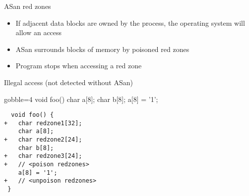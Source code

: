 \begin{frame}[fragile]
  \begin{block}{ASan red zones}
    \begin{itemize}
      \item If adjacent data blocks are owned by the process, the operating system will allow an access
      \item<2> ASan surrounds blocks of memory by poisoned red zones
      \item<2> Program stops when accessing a red zone
    \end{itemize}
  \end{block}
  \begin{exampleblock}{Illegal access (not detected without ASan)}
    \begin{multicols}{2}
      \begin{overprint}
        \begin{cppcode*}{gobble=4}
          void foo() {
            char a[8];
            char b[8];
            a[8] = '1';
          }
        \end{cppcode*}
        \begin{verbatim}
  void foo() {
+   char redzone1[32];
    char a[8];
+   char redzone2[24];
    char b[8];
+   char redzone3[24];
+   // <poison redzones>
    a[8] = '1';
+   // <unpoison redzones>
 }
        \end{verbatim}
      \end{overprint}
      \columnbreak
    \end{multicols}
    \vspace{1mm}
  \end{exampleblock}
\end{frame}

